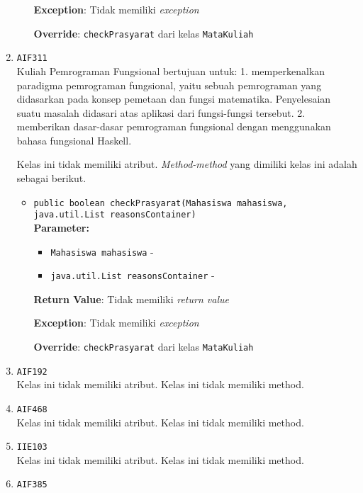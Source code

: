 \documentclass{article}
\begin{document}
\begin{enumerate}
\begin{itemize}
\textbf{Exception}: Tidak memiliki \textit{exception}

\textbf{Override}: \texttt{checkPrasyarat} dari kelas \texttt{MataKuliah}

\end{itemize}
\item \texttt{AIF311}\\ 
Kuliah Pemrograman Fungsional bertujuan untuk: 1. memperkenalkan paradigma
 pemrograman fungsional, yaitu sebuah pemrograman yang didasarkan pada konsep
 pemetaan dan fungsi matematika. Penyelesaian suatu masalah didasari atas
 aplikasi dari fungsi-fungsi tersebut. 2. memberikan dasar-dasar pemrograman
 fungsional dengan menggunakan bahasa fungsional Haskell.

Kelas ini tidak memiliki atribut. \textit{Method-method} yang dimiliki kelas ini adalah sebagai berikut.
\begin{itemize}
\item \texttt{public boolean checkPrasyarat(Mahasiswa mahasiswa, java.util.List reasonsContainer)}\\ 


\textbf{Parameter:}\begin{itemize}
\item \texttt{Mahasiswa mahasiswa} - 
\item \texttt{java.util.List reasonsContainer} - 
\end{itemize}
\textbf{Return Value}: Tidak memiliki \textit{return value}

\textbf{Exception}: Tidak memiliki \textit{exception}

\textbf{Override}: \texttt{checkPrasyarat} dari kelas \texttt{MataKuliah}

\end{itemize}
\item \texttt{AIF192}\\ 


Kelas ini tidak memiliki atribut. Kelas ini tidak memiliki method. \item \texttt{AIF468}\\ 


Kelas ini tidak memiliki atribut. Kelas ini tidak memiliki method. \item \texttt{IIE103}\\ 


Kelas ini tidak memiliki atribut. Kelas ini tidak memiliki method. \item \texttt{AIF385}\\ 



\end{enumerate}
\end{document}
